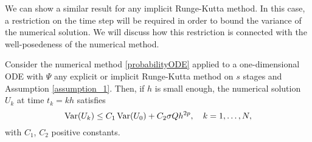 \noindent We can show a similar result for any implicit Runge-Kutta method. In this case, a restriction on the time step will be required in order to bound the variance of the numerical solution. We will discuss how this restriction is connected with the well-posedeness of the numerical method.
\begin{lemma}\label{lem:varimRK} Consider the numerical method \eqref{probabilityODE} applied to a one-dimensional ODE with $\Psi$ any explicit or implicit Runge-Kutta method on $s$ stages and Assumption \ref{assumption_1}. Then, if $h$ is small enough, the numerical solution $U_k$ at time $t_k = kh$ satisfies
	\begin{equation}
	\operatorname{Var}(U_k) \leq C_1\operatorname{Var}(U_0) + C_2\sigma Q h^{2p}, \quad k = 1, \ldots, N,
	\end{equation}
	with $C_1$, $C_2$ positive constants.
\end{lemma}
